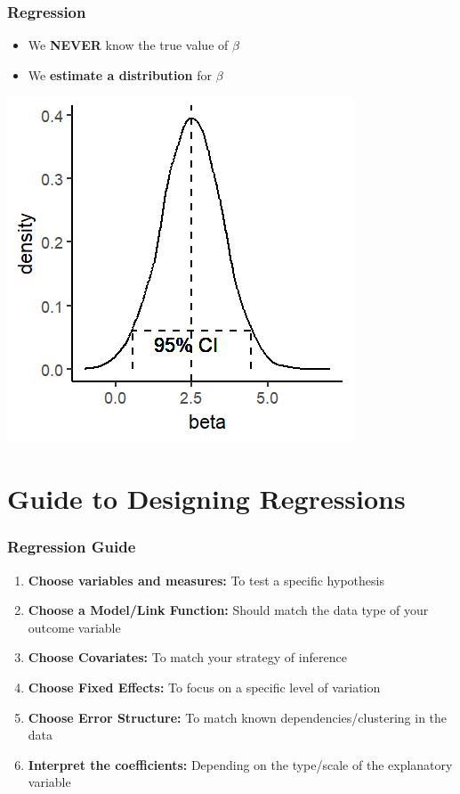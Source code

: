 \documentclass[xcolor=x11names,compress]{beamer}\usepackage[]{graphicx}\usepackage[]{color}
\makeatletter
\def\maxwidth{ %
  \ifdim\Gin@nat@width>\linewidth
    \linewidth
  \else
    \Gin@nat@width
  \fi
}
\newenvironment{knitrout}{}{} %
\renewcommand{\(}{\begin{columns}}
\renewcommand{\)}{\end{columns}}
\newcommand{\<}[1]{\begin{column}{#1}}
\renewcommand{\>}{\end{column}}
\makeatother
\begin{document}
\begin{frame}
\frametitle{Regression}
\begin{itemize}
\item We \textbf{NEVER} know the true value of $\beta$
\item We \textbf{estimate a distribution} for $\beta$
\end{itemize}
\begin{knitrout}
\color{fgcolor}
\includegraphics[width=\maxwidth]{figure/beta_dist5-1} 

\end{knitrout}
\end{frame}


\section{Guide to Designing Regressions}

\begin{frame}
\frametitle{Regression Guide}
\begin{enumerate}
\item \textbf{Choose variables and measures:} To test a specific hypothesis
\item \textbf{Choose a Model/Link Function:} Should match the data type of your outcome variable
\item \textbf{Choose Covariates:} To match your strategy of inference
\item \textbf{Choose Fixed Effects:} To focus on a specific level of variation
\item \textbf{Choose Error Structure:} To match known dependencies/clustering in the data
\item \textbf{Interpret the coefficients:} Depending on the type/scale of the explanatory variable
\end{enumerate}
\end{frame}
\end{document}
